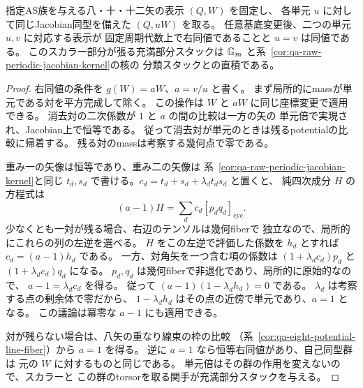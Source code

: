 \begin{corollary}[固定周期代数上でのpotentialの単元倍]
\label{cor:qa-raw-periodic-potential-scalars}
指定AS族を与える八・十・十二矢の表示 $(Q,W)$ を固定し、
各単元 $u$ に対して同じJacobian同型を備えた $(Q,uW)$ を取る。
任意基底変更後、二つの単元 $u,v$ に対応する表示が
固定周期代数上で右同値であることと $u=v$ は同値である。
このスカラー部分が張る充満部分スタックは
$\mathbb G_m$ と系~\ref{cor:qa-raw-periodic-jacobian-kernel}の核の
分類スタックとの直積である。
\end{corollary}
\begin{proof}
右同値の条件を $g(W)=aW$、$a=v/u$ と書く。
まず局所的にmassが単元である対を平方完成して除く。
この操作は $W$ と $aW$ に同じ座標変更で適用できる。
消去対の二次係数が $1$ と $a$ の間の比較は一方の矢の
単元倍で実現され、Jacobian上で恒等である。
従って消去対が単元のときは残るpotentialの比較に帰着する。
残る対のmassは考察する幾何点で零である。

重み一の矢像は恒等であり、重み二の矢像は
系~\ref{cor:qa-raw-periodic-jacobian-kernel}と同じ
$t_d,s_d$ で書ける。$c_d=t_d+s_d+\lambda_dt_ds_d$ と置くと、
純四次成分 $H$ の方程式は
\[
 (a-1)H=\sum_d c_d[p_dq_d]_{\mathrm{cyc}}.
\]
少なくとも一対が残る場合、右辺のテンソルは幾何fiberで
独立なので、局所的にこれらの列の左逆を選べる。
$H$ をこの左逆で評価した係数を $h_d$ とすれば
$c_d=(a-1)h_d$ である。
一方、対角矢を一つ含む項の係数は
$(1+\lambda_d c_d)p_d$ と $(1+\lambda_d c_d)q_d$ になる。
$p_d,q_d$ は幾何fiberで非退化であり、局所的に原始的なので、
$a-1=\lambda_d c_d$ を得る。
従って $(a-1)(1-\lambda_d h_d)=0$ である。
$\lambda_d$ は考察する点の剰余体で零だから、
$1-\lambda_d h_d$ はその点の近傍で単元であり、$a=1$ となる。
この議論は冪零な $a-1$ にも適用できる。

対が残らない場合は、八矢の重なり線束の枠の比較
（系~\ref{cor:qa-eight-potential-line-fiber}）から $a=1$ を得る。
逆に $a=1$ なら恒等右同値があり、自己同型群は
元の $W$ に対するものと同じである。
単元倍はその群の作用を変えないので、スカラーと
この群のtorsorを取る関手が充満部分スタックを与える。
\end{proof}

